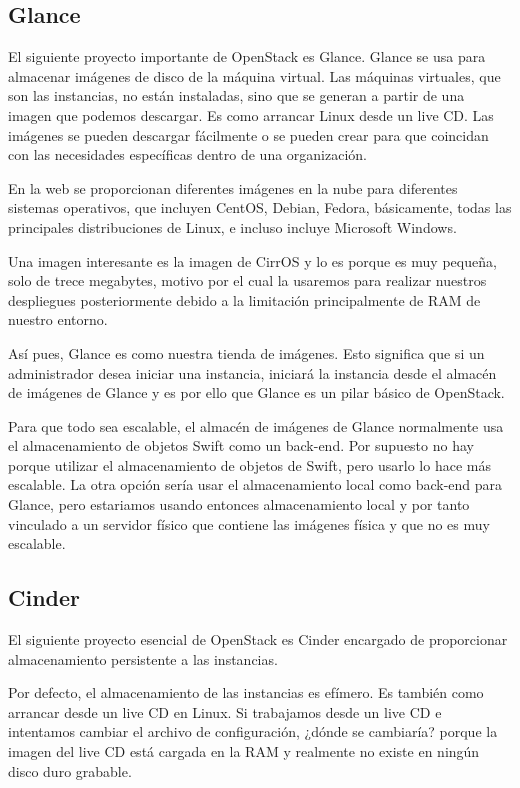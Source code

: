 \subsection{Glance}
El siguiente proyecto importante de OpenStack es Glance. Glance se usa para almacenar imágenes de disco de la máquina virtual\cite{noauthor_glance_nodate}. Las máquinas virtuales, que son las instancias, no están instaladas, sino que se generan a partir de una imagen que podemos descargar\cite{noauthor_get_nodate}. Es como arrancar Linux desde un live CD. Las imágenes se pueden descargar fácilmente o se pueden crear para que coincidan con las necesidades específicas dentro de una organización.

En la web se proporcionan diferentes imágenes en la nube para diferentes sistemas operativos, que incluyen CentOS, Debian, Fedora, básicamente, todas las principales distribuciones de Linux, e incluso incluye Microsoft Windows.

Una imagen interesante es la imagen de CirrOS y lo es porque es muy pequeña, solo de trece megabytes, motivo por el cual la usaremos para realizar nuestros despliegues posteriormente debido a la limitación principalmente de RAM de nuestro entorno.

Así pues, Glance es como nuestra tienda de imágenes. Esto significa que si un administrador desea iniciar una instancia, iniciará la instancia desde el almacén de imágenes de Glance y es por ello que Glance es un pilar básico de OpenStack.

Para que todo sea escalable, el almacén de imágenes de Glance normalmente usa el almacenamiento de objetos Swift como un back-end. Por supuesto no hay porque utilizar el almacenamiento de objetos de Swift, pero usarlo lo hace más escalable. La otra opción sería usar el almacenamiento local como back-end para Glance, pero estariamos usando entonces almacenamiento local y por tanto vinculado a un servidor físico que contiene las imágenes física y que no es muy escalable.

\subsection{Cinder}
El siguiente proyecto esencial de OpenStack es Cinder\cite{noauthor_openstack_nodate-6} encargado de proporcionar almacenamiento persistente a las instancias. 

Por defecto, el almacenamiento de las instancias es efímero.  Es también como arrancar desde un live CD en Linux. Si trabajamos desde un live CD e intentamos cambiar el archivo de configuración, ¿dónde se cambiaría? porque la imagen del live CD está cargada en la RAM y realmente no existe en ningún disco duro grabable.

